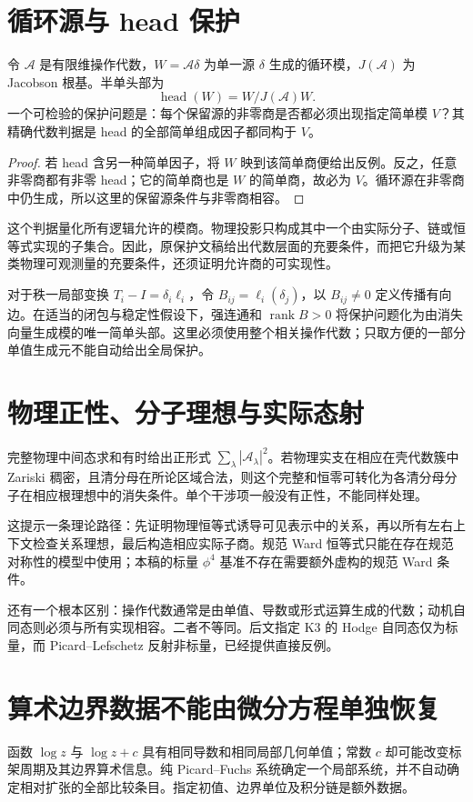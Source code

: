 \documentclass[11pt,a4paper,oneside]{ctexrep}
\theoremstyle{cnplain}
\theoremstyle{definition}
\theoremstyle{remark}
\newcommand{\rank}{\operatorname{rank}}
\begin{document}
\section{循环源与 head 保护}
令 $\mathcal A$ 是有限维操作代数，$W=\mathcal A\delta$ 为单一源 $\delta$ 生成的循环模，$J(\mathcal A)$ 为 Jacobson 根基。半单头部为
\begin{equation}
 \operatorname{head}(W)=W/J(\mathcal A)W.
\end{equation}
一个可检验的保护问题是：每个保留源的非零商是否都必须出现指定简单模 $V$？其精确代数判据是 head 的全部简单组成因子都同构于 $V$。

\begin{proof}
若 head 含另一种简单因子，将 $W$ 映到该简单商便给出反例。反之，任意非零商都有非零 head；它的简单商也是 $W$ 的简单商，故必为 $V$。循环源在非零商中仍生成，所以这里的保留源条件与非零商相容。
\end{proof}

这个判据量化所有逻辑允许的模商。物理投影只构成其中一个由实际分子、链或恒等式实现的子集合。因此，原保护文稿给出代数层面的充要条件，而把它升级为某类物理可观测量的充要条件，还须证明允许商的可实现性。

对于秩一局部变换 $T_i-I=\delta_i\ell_i$，令 $B_{ij}=\ell_i(\delta_j)$，以 $B_{ij}\ne0$ 定义传播有向边。在适当的闭包与稳定性假设下，强连通和 $\rank B>0$ 将保护问题化为由消失向量生成模的唯一简单头部。这里必须使用整个相关操作代数；只取方便的一部分单值生成元不能自动给出全局保护。

\section{物理正性、分子理想与实际态射}
完整物理中间态求和有时给出正形式 $\sum_\lambda|\mathcal A_\lambda|^2$。若物理实支在相应在壳代数簇中 Zariski 稠密，且清分母在所论区域合法，则这个完整和恒零可转化为各清分母分子在相应根理想中的消失条件。单个干涉项一般没有正性，不能同样处理。

这提示一条理论路径：先证明物理恒等式诱导可见表示中的关系，再以所有左右上下文检查关系理想，最后构造相应实际子商。规范 Ward 恒等式只能在存在规范对称性的模型中使用；本稿的标量 $\phi^4$ 基准不存在需要额外虚构的规范 Ward 条件。

还有一个根本区别：操作代数通常是由单值、导数或形式运算生成的代数；动机自同态则必须与所有实现相容。二者不等同。后文指定 K3 的 Hodge 自同态仅为标量，而 Picard--Lefschetz 反射非标量，已经提供直接反例。

\section{算术边界数据不能由微分方程单独恢复}
函数 $\log z$ 与 $\log z+c$ 具有相同导数和相同局部几何单值；常数 $c$ 却可能改变标架周期及其边界算术信息。纯 Picard--Fuchs 系统确定一个局部系统，并不自动确定相对扩张的全部比较条目。指定初值、边界单位及积分链是额外数据。
\end{document}
